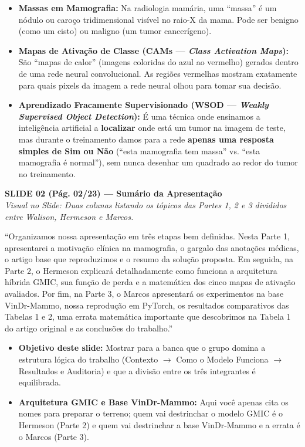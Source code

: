 \documentclass[11pt,a4paper]{article}
\newcommand{\slideheader}[3]{%
    \vspace{10pt}%
    \begin{tcolorbox}[colback=slateborder, colframe=slateborder, coltext=white, boxrule=0pt, arc=3pt, left=8pt, right=8pt, top=5pt, bottom=5pt]
        {\large\bfseries #1 — #2}\\[2pt]
        {\small\itshape Visual no Slide: #3}
    \end{tcolorbox}%
}
\newenvironment{falabox}{%
    \begin{tcolorbox}[colback=speechbg, colframe=speechborder, boxrule=1.2pt, arc=4pt, left=10pt, right=10pt, top=8pt, bottom=8pt, title={\bfseries O QUE VOCÊ DEVE FALAR (Fala Sugerida)}]%
}{%
    \end{tcolorbox}%
}
\newenvironment{explicabox}{%
    \begin{tcolorbox}[colback=explainbg, colframe=explainborder, boxrule=0.8pt, arc=4pt, left=10pt, right=10pt, top=8pt, bottom=8pt, title={\bfseries ENTENDA O QUE VOCÊ ESTÁ FALANDO (Explicação Didática de Cada Termo)}]%
}{%
    \end{tcolorbox}%
}
\begin{document}
\begin{explicabox}
\begin{itemize}[leftmargin=*, itemsep=4pt]
    \item \textbf{Massas em Mamografia:} Na radiologia mamária, uma ``massa'' é um nódulo ou caroço tridimensional visível no raio-X da mama. Pode ser benigno (como um cisto) ou maligno (um tumor cancerígeno).
    \item \textbf{Mapas de Ativação de Classe (CAMs — \textit{Class Activation Maps}):} São ``mapas de calor'' (imagens coloridas do azul ao vermelho) gerados dentro de uma rede neural convolucional. As regiões vermelhas mostram exatamente para quais pixels da imagem a rede neural olhou para tomar sua decisão.
    \item \textbf{Aprendizado Fracamente Supervisionado (WSOD — \textit{Weakly Supervised Object Detection}):} É uma técnica onde ensinamos a inteligência artificial a \textbf{localizar} onde está um tumor na imagem de teste, mas durante o treinamento damos para a rede \textbf{apenas uma resposta simples de Sim ou Não} (``esta mamografia tem massa'' vs. ``esta mamografia é normal''), sem nunca desenhar um quadrado ao redor do tumor no treinamento.
\end{itemize}
\end{explicabox}

\newpage
\slideheader{SLIDE 02 (Pág. 02/23)}{Sumário da Apresentação}{Duas colunas listando os tópicos das Partes 1, 2 e 3 divididos entre Walison, Hermeson e Marcos.}

\begin{falabox}
``Organizamos nossa apresentação em três etapas bem definidas. Nesta Parte 1, apresentarei a motivação clínica na mamografia, o gargalo das anotações médicas, o artigo base que reproduzimos e o resumo da solução proposta. Em seguida, na Parte 2, o Hermeson explicará detalhadamente como funciona a arquitetura híbrida GMIC, sua função de perda e a matemática dos cinco mapas de ativação avaliados. Por fim, na Parte 3, o Marcos apresentará os experimentos na base VinDr-Mammo, nossa reprodução em PyTorch, os resultados comparativos das Tabelas 1 e 2, uma errata matemática importante que descobrimos na Tabela 1 do artigo original e as conclusões do trabalho.''
\end{falabox}

\begin{explicabox}
\begin{itemize}[leftmargin=*, itemsep=4pt]
    \item \textbf{Objetivo deste slide:} Mostrar para a banca que o grupo domina a estrutura lógica do trabalho (Contexto $\to$ Como o Modelo Funciona $\to$ Resultados e Auditoria) e que a divisão entre os três integrantes é equilibrada.
    \item \textbf{Arquitetura GMIC e Base VinDr-Mammo:} Aqui você apenas cita os nomes para preparar o terreno; quem vai destrinchar o modelo GMIC é o Hermeson (Parte 2) e quem vai destrinchar a base VinDr-Mammo e a errata é o Marcos (Parte 3).
\end{itemize}
\end{explicabox}
\end{document}
